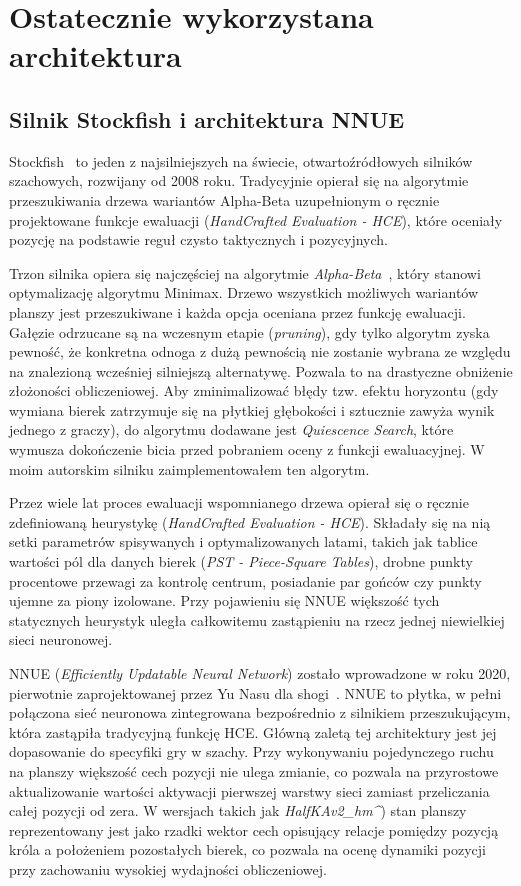 \documentclass[12pt,a4paper]{report}
\begin{document}
\section{Ostatecznie wykorzystana architektura}

\subsection{Silnik Stockfish i architektura NNUE}

Stockfish~\cite{stockfish} to jeden z najsilniejszych na świecie, otwartoźródłowych silników szachowych, rozwijany od 2008 roku. Tradycyjnie opierał się na algorytmie przeszukiwania drzewa wariantów Alpha-Beta uzupełnionym o ręcznie projektowane funkcje ewaluacji (\textit{HandCrafted Evaluation - HCE}), które oceniały pozycję na podstawie reguł czysto taktycznych i pozycyjnych.

Trzon silnika opiera się najczęściej na algorytmie \textit{Alpha-Beta}~\cite{knuth1975analysis}, który stanowi optymalizację algorytmu Minimax. Drzewo wszystkich możliwych wariantów planszy jest przeszukiwane i każda opcja oceniana przez funkcję ewaluacji. Gałęzie odrzucane są na wczesnym etapie (\textit{pruning}), gdy tylko algorytm zyska pewność, że konkretna odnoga z dużą pewnością nie zostanie wybrana ze względu na znalezioną wcześniej silniejszą alternatywę. Pozwala to na drastyczne obniżenie złożoności obliczeniowej. Aby zminimalizować błędy tzw. efektu horyzontu (gdy wymiana bierek zatrzymuje się na płytkiej głębokości i sztucznie zawyża wynik jednego z graczy), do algorytmu dodawane jest \textit{Quiescence Search}, które wymusza dokończenie bicia przed pobraniem oceny z funkcji ewaluacyjnej. W moim autorskim silniku zaimplementowałem ten algorytm.

Przez wiele lat proces ewaluacji wspomnianego drzewa opierał się o ręcznie zdefiniowaną heurystykę (\textit{HandCrafted Evaluation - HCE}). Składały się na nią setki parametrów spisywanych i optymalizowanych latami, takich jak tablice wartości pól dla danych bierek (\textit{PST - Piece-Square Tables}), drobne punkty procentowe przewagi za kontrolę centrum, posiadanie par gońców czy punkty ujemne za piony izolowane. Przy pojawieniu się NNUE większość tych statycznych heurystyk uległa całkowitemu zastąpieniu na rzecz jednej niewielkiej sieci neuronowej.

NNUE (\textit{Efficiently Updatable Neural Network}) zostało wprowadzone w roku 2020, pierwotnie zaprojektowanej przez Yu Nasu dla shogi~\cite{nasu2018efficiently}. NNUE to płytka, w pełni połączona sieć neuronowa zintegrowana bezpośrednio z silnikiem przeszukującym, która zastąpiła tradycyjną funkcję HCE. Główną zaletą tej architektury jest jej dopasowanie do specyfiki gry w szachy. Przy wykonywaniu pojedynczego ruchu na planszy większość cech pozycji nie ulega zmianie, co pozwala na przyrostowe aktualizowanie wartości aktywacji pierwszej warstwy sieci zamiast przeliczania całej pozycji od zera. W wersjach takich jak \textit{HalfKAv2\_hm\string^}) stan planszy reprezentowany jest jako rzadki wektor cech opisujący relacje pomiędzy pozycją króla a położeniem pozostałych bierek, co pozwala na ocenę dynamiki pozycji przy zachowaniu wysokiej wydajności obliczeniowej.
\end{document}
